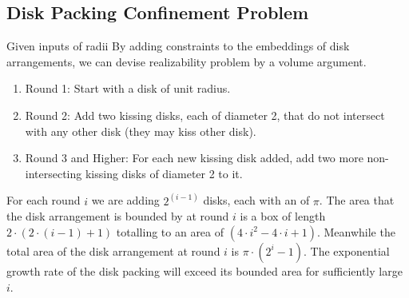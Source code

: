 \subsection{Disk Packing Confinement Problem}

Given inputs of radii 
By adding constraints to the embeddings of disk arrangements, we can devise realizability problem 
by a volume argument.
\begin{enumerate}%
\item Round 1: Start with a disk of unit radius.
\item Round 2: Add two kissing disks, each of diameter 2, that do not intersect with any other 
disk (they 
may kiss other
disk).
\item Round 3 and Higher: For each new kissing disk added, add two more non-intersecting kissing 
disks of diameter 2 to it.
\end{enumerate} 
For each round $i$ we are adding $2^{(i-1)}$ disks, each with an of $\pi$.  The area that 
the disk arrangement is bounded by at round $i$ is a box of length $2\cdot (2\cdot (i-1)+1)$ 
totalling to an area of $(4\cdot i^2 - 4\cdot i + 1)$.  Meanwhile the total area of the disk 
arrangement at round $i$ is $\pi \cdot (2^i - 1)$.  The exponential growth rate of the disk packing 
will exceed its bounded area for sufficiently large $i$.

